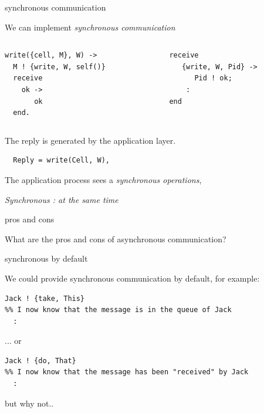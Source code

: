 \begin{frame}[fragile]{synchronous communication}

We can implement {\em synchronous communication}
\pause\vspace{20pt}

\begin{columns}
 \begin{column}{0.5\linewidth}
  \begin{verbatim}
write({cell, M}, W) ->
  M ! {write, W, self()}
  receive
    ok ->
       ok
  end.
  \end{verbatim}
  \pause
 \end{column}
 \begin{column}{0.5\linewidth}
  \begin{verbatim}
  receive 
     {write, W, Pid} ->
        Pid ! ok;
      :
  end
  \end{verbatim}
 \end{column}
\end{columns}
\pause\vspace{10pt}
        
The reply is generated by the application layer.
\pause\vspace{5pt}

\begin{verbatim}
  Reply = write(Cell, W),
\end{verbatim}

The application process sees a {\em synchronous operations},
\pause\vspace{5pt}

{\em Synchronous : at the same time}
\end{frame}

\begin{frame}{pros and cons}

What are the pros and cons of asynchronous communication?

\end{frame}

\begin{frame}[fragile]{synchronous by default}

We could provide synchronous communication by default, for example:
\pause\vspace{10pt}
\begin{verbatim}
Jack ! {take, This}
%% I now know that the message is in the queue of Jack
  :
\end{verbatim}

\pause 
\vspace{10pt}... or\vspace{10pt}
\begin{verbatim}
Jack ! {do, That}
%% I now know that the message has been "received" by Jack
  :
\end{verbatim}
\pause 
\vspace{10pt}but why not..\vspace{10pt}
\end{frame}

